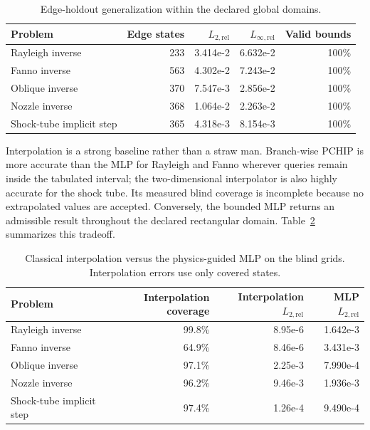 \documentclass[preprint,12pt]{elsarticle}
\newenvironment{revision}{}{}
\newenvironment{revision}{\color{revisionblue}}{}
\newcommand{\relLtwo}{L_{2,\mathrm{rel}}}
\newcommand{\relLinf}{L_{\infty,\mathrm{rel}}}
\begin{document}
\begin{revision}
\begin{table}[H]
\centering
\caption{Edge-holdout generalization within the declared global domains.}
\label{tab:edge_holdout}
\small
\begin{tabular}{lrrrr}
\toprule
Problem & Edge states & $\relLtwo$ & $\relLinf$ & Valid bounds \\
\midrule
Rayleigh inverse & 233 & 3.414e-2 & 6.632e-2 & 100\% \\
Fanno inverse & 563 & 4.302e-2 & 7.243e-2 & 100\% \\
Oblique inverse & 370 & 7.547e-3 & 2.856e-2 & 100\% \\
Nozzle inverse & 368 & 1.064e-2 & 2.263e-2 & 100\% \\
Shock-tube implicit step & 365 & 4.318e-3 & 8.154e-3 & 100\% \\
\bottomrule
\end{tabular}
\end{table}

Interpolation is a strong baseline rather than a straw man. Branch-wise PCHIP is more accurate than the MLP for Rayleigh and Fanno wherever queries remain inside the tabulated interval; the two-dimensional interpolator is also highly accurate for the shock tube. Its measured blind coverage is incomplete because no extrapolated values are accepted. Conversely, the bounded MLP returns an admissible result throughout the declared rectangular domain. Table~\ref{tab:interpolation_baseline} summarizes this tradeoff.

\begin{table}[H]
\centering
\caption{Classical interpolation versus the physics-guided MLP on the blind grids. Interpolation errors use only covered states.}
\label{tab:interpolation_baseline}
\small
\begin{tabular}{lrrr}
\toprule
Problem & Interpolation coverage & Interpolation $\relLtwo$ & MLP $\relLtwo$ \\
\midrule
Rayleigh inverse & 99.8\% & 8.95e-6 & 1.642e-3 \\
Fanno inverse & 64.9\% & 8.46e-6 & 3.431e-3 \\
Oblique inverse & 97.1\% & 2.25e-3 & 7.990e-4 \\
Nozzle inverse & 96.2\% & 9.46e-3 & 1.936e-3 \\
Shock-tube implicit step & 97.4\% & 1.26e-4 & 9.490e-4 \\
\bottomrule
\end{tabular}
\end{table}


\end{revision}
\end{document}
